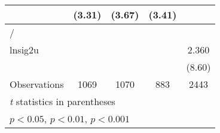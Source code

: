 {\begin{longtable}{l*{4}{c}}
                &   (3.31)         &   (3.67)         &   (3.41)         &                  \\
\hline
/               &                  &                  &                  &                  \\
lnsig2u         &                  &                  &                  &    2.360\sym{***}\\
                &                  &                  &                  &   (8.60)         \\
\hline
Observations    &     1069         &     1070         &      883         &     2443         \\
\hline\hline
\multicolumn{5}{l}{\footnotesize \textit{t} statistics in parentheses}\\
\multicolumn{5}{l}{\footnotesize \sym{*} \(p<0.05\), \sym{**} \(p<0.01\), \sym{***} \(p<0.001\)}\\
\end{longtable}
}
